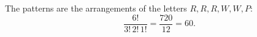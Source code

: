 The patterns are the arrangements of the letters $R,R,R,W,W,P$:
\[\dfrac{6!}{3!\,2!\,1!}=\dfrac{720}{12}=\boxed{60}.\]
